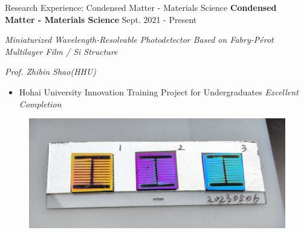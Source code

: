 \documentclass[9pt,aspectratio=169,hyperref=colorlinks]{beamer}
\begin{document}
\begin{frame}{Research Experience: Condensed Matter - Materials Science}
    \medskip \textbf{Condensed Matter - Materials Science} \hfill Sept. 2021 - Present

    \quad \textit{Miniaturized Wavelength-Resolvable Photodetector Based on Fabry-P\'{e}rot Multilayer Film / Si Structure}

    \hfill \textit{Prof. Zhibin Shao(HHU)}

    \begin{itemize}
        \item Hohai University Innovation Training Project for Undergraduates \textit{Excellent Completion}
    \end{itemize}

    \begin{figure}
        \centering
        \includegraphics[scale=0.12]{./figs/Miniaturized Wavelength-Resolvable Photodetector Based on Fabry-Perot Multilayer Film - Si Structure.png}
    \end{figure}
\end{frame}
\end{document}

